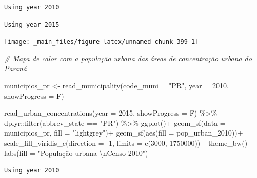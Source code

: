 \documentclass[
  brazilian,
]{book}
\newenvironment{Shaded}{\begin{snugshade}}{\end{snugshade}}
\newcommand{\AttributeTok}[1]{\textcolor[rgb]{0.77,0.63,0.00}{#1}}
\newcommand{\CommentTok}[1]{\textcolor[rgb]{0.56,0.35,0.01}{\textit{#1}}}
\newcommand{\DecValTok}[1]{\textcolor[rgb]{0.00,0.00,0.81}{#1}}
\newcommand{\FunctionTok}[1]{\textcolor[rgb]{0.00,0.00,0.00}{#1}}
\newcommand{\NormalTok}[1]{#1}
\newcommand{\OtherTok}[1]{\textcolor[rgb]{0.56,0.35,0.01}{#1}}
\newcommand{\SpecialCharTok}[1]{\textcolor[rgb]{0.00,0.00,0.00}{#1}}
\newcommand{\StringTok}[1]{\textcolor[rgb]{0.31,0.60,0.02}{#1}}
\begin{document}
\begin{verbatim}
Using year 2010
\end{verbatim}

\begin{verbatim}
Using year 2015
\end{verbatim}

\begin{center}\texttt{[image: \_main\_files/figure-latex/unnamed-chunk-399-1]} \end{center}

\begin{Shaded}
\begin{Highlighting}[]
\CommentTok{\# Mapa de calor com a população urbana das áreas de concentração urbana do Paraná}

\NormalTok{municipios\_pr }\OtherTok{\textless{}{-}} \FunctionTok{read\_municipality}\NormalTok{(}\AttributeTok{code\_muni =} \StringTok{"PR"}\NormalTok{,}
                                   \AttributeTok{year =} \DecValTok{2010}\NormalTok{,}
                                   \AttributeTok{showProgress =}\NormalTok{ F)}

\FunctionTok{read\_urban\_concentrations}\NormalTok{(}\AttributeTok{year =} \DecValTok{2015}\NormalTok{,}
                          \AttributeTok{showProgress =}\NormalTok{ F) }\SpecialCharTok{\%\textgreater{}\%} 
\NormalTok{  dplyr}\SpecialCharTok{::}\FunctionTok{filter}\NormalTok{(abbrev\_state }\SpecialCharTok{==} \StringTok{"PR"}\NormalTok{) }\SpecialCharTok{\%\textgreater{}\%}
  \FunctionTok{ggplot}\NormalTok{()}\SpecialCharTok{+}
  \FunctionTok{geom\_sf}\NormalTok{(}\AttributeTok{data =}\NormalTok{ municipios\_pr, }\AttributeTok{fill =} \StringTok{"lightgrey"}\NormalTok{)}\SpecialCharTok{+}
  \FunctionTok{geom\_sf}\NormalTok{(}\FunctionTok{aes}\NormalTok{(}\AttributeTok{fill =}\NormalTok{ pop\_urban\_2010))}\SpecialCharTok{+}
  \FunctionTok{scale\_fill\_viridis\_c}\NormalTok{(}\AttributeTok{direction =} \SpecialCharTok{{-}}\DecValTok{1}\NormalTok{, }\AttributeTok{limits =} \FunctionTok{c}\NormalTok{(}\DecValTok{3000}\NormalTok{, }\DecValTok{1750000}\NormalTok{))}\SpecialCharTok{+}
  \FunctionTok{theme\_bw}\NormalTok{()}\SpecialCharTok{+}
  \FunctionTok{labs}\NormalTok{(}\AttributeTok{fill =} \StringTok{"População urbana }\SpecialCharTok{\textbackslash{}n}\StringTok{Censo 2010"}\NormalTok{)}
\end{Highlighting}
\end{Shaded}

\begin{verbatim}
Using year 2010
\end{verbatim}
\end{document}

